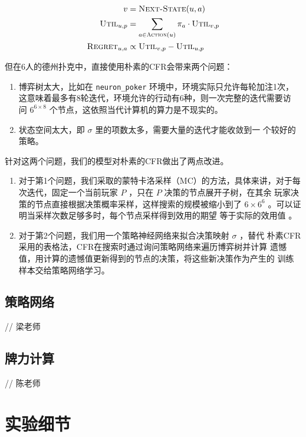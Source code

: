 \documentclass[11pt]{article}
\begin{document}
\begin{align}
  \label{eq:cfr1} v &=  \textsc{Next-State}(u, a) \\
  \label{eq:cfr2} \textsc{Util}_{u,p} &= \sum_{a\in \textsc{Action}(u)} \pi_a\cdot \textsc{Util}_{v,p} \\
  \label{eq:cfr3} \textsc{Regret}_{u,a} &\propto \textsc{Util}_{v, p}-\textsc{Util}_{u,p}
\end{align}


但在6人的德州扑克中，直接使用朴素的CFR会带来两个问题：
\begin{enumerate}
\item 博弈树太大，比如在 \texttt{neuron\_poker} 环境中，环境实际只允许每轮加注1次，
这意味着最多有8轮迭代，环境允许的行动有6种，则一次完整的迭代需要访
问 \(6^{6\times 8}\) 个节点，这依照当代计算机的算力是不现实的。
\item 状态空间太大，即 \(\sigma\) 里的项数太多，需要大量的迭代才能收敛到一
个较好的策略。
\end{enumerate}

针对这两个问题，我们的模型对朴素的CFR做出了两点改进。
\begin{enumerate}
\item 对于第1个问题，我们采取的蒙特卡洛采样（MC）的方法，具体来讲，对于每
次迭代，固定一个当前玩家 \(P\) ，只在 \(P\) 决策的节点展开子树，在其余
玩家决策的节点直接根据决策概率采样，这样搜索的规模被缩小到了
\(6\times 6^6\) 。可以证明当采样次数足够多时，每个节点采样得到效用的期望
等于实际的效用值 \cite{burch2012efficient} 。
\item 对于第2个问题，我们用一个策略神经网络来拟合决策映射 \(\sigma\) ，替代
朴素CFR采用的表格法，CFR在搜索时通过询问策略网络来遍历博弈树并计算
遗憾值，用计算的遗憾值更新得到的节点的决策，将这些新决策作为产生的
训练样本交给策略网络学习。
\end{enumerate}

\subsection{}
\label{sec:orgca0f26b}
\subsection{策略网络}
\label{sec:orga45c8b3}
// 梁老师
\subsection{牌力计算}
\label{sec:org04e34d4}
// 陈老师

\section{实验细节}
\label{sec:org050bede}
\end{document}
